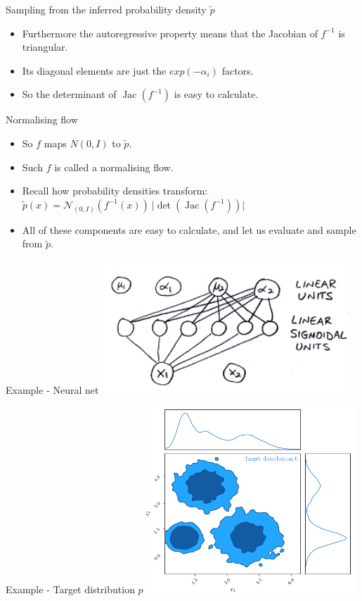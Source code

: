 \documentclass[usenames,dvipsnames]{beamer}
\DeclareMathOperator{\jac}{Jac}
\begin{document}
\begin{frame}{Sampling from the inferred probability density $\tilde{p}$}
    \begin{itemize}
      \item{Furthermore the autoregressive property means that the Jacobian of $f^{-1}$ is triangular.}
	\item{Its diagonal elements are just the $exp(-\alpha_i)$ factors.}
	\item{So the determinant of $\jac(f^{-1})$ is easy to calculate.}
    \end{itemize}
\end{frame}

\begin{frame}{Normalising flow}
    \begin{itemize}
      \item{So $f$ maps $N(0, I)$ to $\tilde{p}$.}
	\item{Such $f$ is called a normalising flow.}
	\item{Recall how probability densities transform: \\
	$\tilde{p}(x) = \mathcal{N}_{(0, I)}(f^{-1}(x)) \ \lvert \det(\jac(f^{-1})) \rvert$}
	\item{All of these components are easy to calculate, and let us evaluate and sample from $\tilde{p}$.}
    \end{itemize}
\end{frame}

\begin{frame}{Example - Neural net}
     \centering
     \includegraphics[height=5cm]{image_06}
\end{frame}

\begin{frame}{Example - Target distribution $p$}
     \centering
     \includegraphics[height=7cm]{image_07}
\end{frame}
\end{document}
